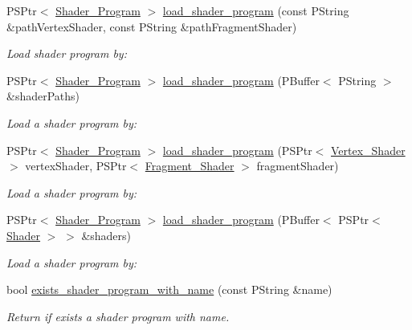 \begin{DoxyCompactItemize}
\item 
P\+S\+Ptr$<$ \mbox{\hyperlink{classprz_1_1_shader___program}{Shader\+\_\+\+Program}} $>$ \mbox{\hyperlink{classprz_1_1_shader___program___loader_a30e0a0233aaecaef88771c0cbd6bf34d}{load\+\_\+shader\+\_\+program}} (const P\+String \&path\+Vertex\+Shader, const P\+String \&path\+Fragment\+Shader)
\begin{DoxyCompactList}\small\item\em Load shader program by\+: \end{DoxyCompactList}\item 
P\+S\+Ptr$<$ \mbox{\hyperlink{classprz_1_1_shader___program}{Shader\+\_\+\+Program}} $>$ \mbox{\hyperlink{classprz_1_1_shader___program___loader_aa5dd051be718aba2a19c66b2e7e6d55d}{load\+\_\+shader\+\_\+program}} (P\+Buffer$<$ P\+String $>$ \&shader\+Paths)
\begin{DoxyCompactList}\small\item\em Load a shader program by\+: \end{DoxyCompactList}\item 
P\+S\+Ptr$<$ \mbox{\hyperlink{classprz_1_1_shader___program}{Shader\+\_\+\+Program}} $>$ \mbox{\hyperlink{classprz_1_1_shader___program___loader_a2e7b3a77a496ac0d906852a2c727364e}{load\+\_\+shader\+\_\+program}} (P\+S\+Ptr$<$ \mbox{\hyperlink{classprz_1_1_vertex___shader}{Vertex\+\_\+\+Shader}} $>$ vertex\+Shader, P\+S\+Ptr$<$ \mbox{\hyperlink{classprz_1_1_fragment___shader}{Fragment\+\_\+\+Shader}} $>$ fragment\+Shader)
\begin{DoxyCompactList}\small\item\em Load a shader program by\+: \end{DoxyCompactList}\item 
P\+S\+Ptr$<$ \mbox{\hyperlink{classprz_1_1_shader___program}{Shader\+\_\+\+Program}} $>$ \mbox{\hyperlink{classprz_1_1_shader___program___loader_abea22b3ab2b7723d8a43bf7ab66cfdaf}{load\+\_\+shader\+\_\+program}} (P\+Buffer$<$ P\+S\+Ptr$<$ \mbox{\hyperlink{classprz_1_1_shader}{Shader}} $>$ $>$ \&shaders)
\begin{DoxyCompactList}\small\item\em Load a shader program by\+: \end{DoxyCompactList}\item 
bool \mbox{\hyperlink{classprz_1_1_shader___program___loader_a8f29cfe9fe72b5c1b5b92f327aaa8ec4}{exists\+\_\+shader\+\_\+program\+\_\+with\+\_\+name}} (const P\+String \&name)
\begin{DoxyCompactList}\small\item\em Return if exists a shader program with name. \end{DoxyCompactList}\item 

\end{DoxyCompactItemize}
